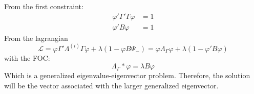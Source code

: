 \documentclass[12pt, a4paper]{article}
\begin{document}
From the first constraint:
\begin{align*}
	\varphi'\Gamma'\Gamma \varphi &= 1 \\
	\varphi' B \varphi &= 1
\end{align*}
From the lagrangian
\begin{equation*}
	\mathcal{L} = \varphi\Gamma'\Lambda^{(i)}\Gamma\varphi + \lambda(1-\varphi B \Psi_{-} ) = \varphi\Lambda_{\Gamma}\varphi + \lambda(1-\varphi' B \varphi )
\end{equation*}
with the FOC:
\begin{equation*}
	\Lambda_{\Gamma}*\varphi = \lambda B \varphi
\end{equation*}
Which is a generalized eigenvalue-eigenvector problem. Therefore, the solution will be the vector associated with the larger generalized eigenvector.
\end{document}
